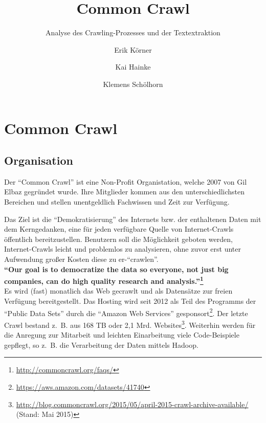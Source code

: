 \documentclass[a4paper,12pt,titlepage=false]{scrreprt}
\title{\vspace{3cm}Common Crawl}
\subtitle{Analyse des Crawling-Prozesses und der Textextraktion}
\author{Erik Körner \and Kai Hainke \and Klemens Schölhorn}
\begin{document}
\maketitle
\vspace{2cm}
\tableofcontents

\onehalfspacing

\chapter{Common Crawl}

\section{Organisation}

Der ``Common Crawl'' ist eine Non-Profit Organistation, welche 2007 von Gil Elbaz gegründet wurde.
Ihre Mitglieder kommen aus den unterschiedlichsten Bereichen und stellen unentgeldlich Fachwissen und Zeit zur Verfügung.

Das Ziel ist die ``Demokratisierung'' des Internets bzw. der enthaltenen Daten mit dem Kerngedanken, eine für jeden verfügbare Quelle von Internet-Crawls öffentlich bereitzustellen.
Benutzern soll die Möglichkeit geboten werden, Internet-Crawls leicht und problemlos zu analysieren, ohne zuvor erst unter Aufwendung großer Kosten diese zu er-``crawlen''.
\\

\textbf{``Our goal is to democratize the data so everyone, not just big companies, can do high quality research and analysis.''\footnote{\url{http://commoncrawl.org/faqs/}}}
\\

Es wird (fast) monatlich das Web gecrawlt und als Datensätze zur freien Verfügung bereitgestellt.
Das Hosting wird seit 2012 als Teil des Programms der ``Public Data Sets'' durch die ``Amazon Web Services'' gesponsort\footnote{\url{https://aws.amazon.com/datasets/41740}}.
Der letzte Crawl bestand z.\ B. aus 168 TB oder 2,1 Mrd. Websites\footnote{\url{http://blog.commoncrawl.org/2015/05/april-2015-crawl-archive-available/} (Stand: Mai 2015)}.
Weiterhin werden für die Anregung zur Mitarbeit und leichten Einarbeitung viele Code-Beispiele gepflegt, so z.\ B. die Verarbeitung der Daten mittels Hadoop.
\end{document}
